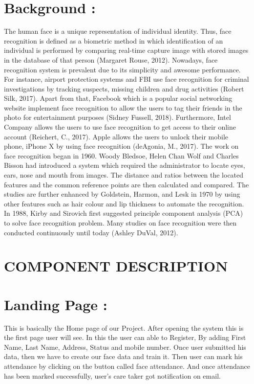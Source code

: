 \section{Background :}
The human face is a unique representation of individual identity. Thus, face recognition is defined as a biometric method in which identification of an individual is performed by comparing real-time capture image with stored images in the database of that person (Margaret Rouse, 2012). 
Nowadays, face recognition system is prevalent due to its simplicity and awesome performance. For instance, airport protection systems and FBI use face recognition for criminal investigations by tracking suspects, missing children and drug activities (Robert Silk, 2017). Apart from that, Facebook which is a popular social networking website implement face recognition to allow the users to tag their friends in the photo for entertainment purposes (Sidney Fussell, 2018). Furthermore, Intel Company allows the users to use face recognition to get access to their online account (Reichert, C., 2017). Apple allows the users to unlock their mobile phone, iPhone X by using face recognition (deAgonia, M., 2017). 
The work on face recognition began in 1960. Woody Bledsoe, Helen Chan Wolf and Charles Bisson had introduced a system which required the administrator to locate eyes, ears, nose and mouth from images. The distance and ratios between the located features and the common reference points are then calculated and compared. The studies are further enhanced by Goldstein, Harmon, and Lesk in 1970 by using other features such as hair colour and lip thickness to automate the recognition. In 1988, Kirby and Sirovich first suggested principle component analysis (PCA) to solve face recognition problem. Many studies on face recognition were then conducted continuously until today (Ashley DuVal, 2012). 


\newpage
\section{COMPONENT DESCRIPTION
}
\section{Landing Page :}
This is basically the Home page of our Project. After opening the system this is the first page user will see. In this the
user can able to Register, By adding First Name, Last Name, Address, Status and mobile number. Once user submitted
his data, then we have to create our face data and train it. Then user can mark his attendance by clicking on the button
called face attendance.
And once attendance has been marked successfully, user’s care taker got notification on email.
\newpage
